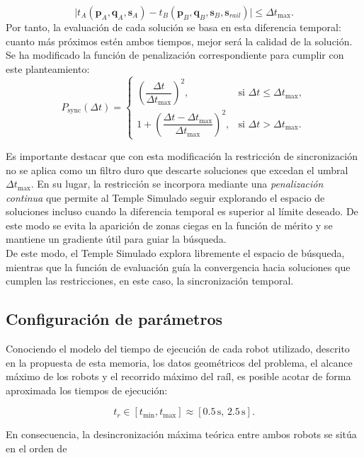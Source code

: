 \[\big|t_A(\mathbf{p}_A,\mathbf{q}_A,\mathbf{s}_A)-t_B(\mathbf{p}_B,\mathbf{q}_B,\mathbf{s}_B,\mathbf{s}_{rail})\big| \le \Delta t_{\max}.\]
Por tanto, la evaluación de cada solución se basa en esta diferencia temporal:
cuanto más próximos estén ambos tiempos, mejor será la calidad de la solución. Se ha 
modificado la función de penalización correspondiente para cumplir con 
este planteamiento:
\[
P_{\text{sync}}(\Delta t) =
\begin{cases}
\left(\dfrac{\Delta t}{\Delta t_{\max}}\right)^2,
& \text{si } \Delta t \le \Delta t_{\max}, \\
1 + \left(\dfrac{\Delta t - \Delta t_{\max}}{\Delta t_{\max}}\right)^2,
& \text{si } \Delta t > \Delta t_{\max}.
\end{cases}
\]

Es importante destacar que con esta modificación la restricción de sincronización
no se aplica como un filtro duro que descarte soluciones que excedan el umbral
\(\Delta t_{\max}\). En su lugar, la restricción se incorpora mediante una
\emph{penalización continua} que permite al Temple Simulado seguir explorando el
espacio de soluciones incluso cuando la diferencia temporal es superior al
límite deseado. De este modo se evita la aparición de zonas ciegas en la función
de mérito y se mantiene un gradiente útil para guiar la búsqueda. \\

De este modo, el Temple Simulado explora libremente el espacio de búsqueda,
mientras que la función de evaluación guía la convergencia hacia soluciones que
cumplen las restricciones, en este caso, la sincronización temporal.

\subsection*{Configuración de parámetros}

Conociendo el modelo del tiempo de ejecución de cada robot utilizado, descrito
en la propuesta de esta memoria, los datos geométricos del problema, el
alcance máximo de los robots y el recorrido máximo del raíl, es posible acotar
de forma aproximada los tiempos de ejecución:


\[
t_r \in [t_{\min}, t_{\max}] \approx [0.5\,\text{s},\, 2.5\,\text{s}].
\]



En consecuencia, la desincronización máxima teórica entre ambos robots se sitúa
en el orden de


